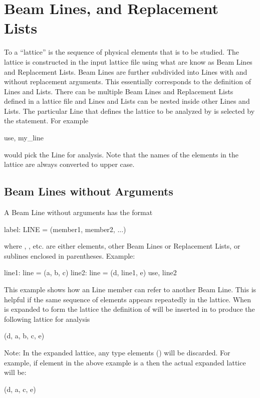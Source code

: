 \chapter{Beam Lines, and Replacement Lists}
\label{c:sequence}

To \bmad a ``lattice'' is the sequence of physical
elements that is to be studied. The lattice is constructed in the
input lattice file using what are know as Beam Lines and Replacement
Lists. Beam Lines are further subdivided into Lines with and without
replacement arguments. This essentially corresponds to the \mad
definition of Lines and Lists. There can be multiple Beam Lines and
Replacement Lists defined in a lattice file and Lines and Lists can be
nested inside other Lines and Lists. The particular Line that defines
the lattice to be analyzed by \bmad is selected by the 
statement. For example
\begin{example}
  use, my_line
\end{example}
would pick the Line  for analysis. 
Note that the names of the elements in the
lattice are always converted to upper case.

\section{Beam Lines without Arguments}
\label{s:lines.wo.arg}

A Beam Line without arguments has the format
\begin{example}
  label: LINE = (member1, member2, ...)
\end{example}
where , , etc. are either elements, other Beam
Lines or Replacement Lists, or sublines enclosed in parentheses.
Example:
\begin{example}
  line1: line = (a, b, c)
  line2: line = (d, line1, e)
  use, line2
\end{example}
This example shows how an Line member can refer to another Beam Line.
This is helpful if the same sequence of elements appears repeatedly in
the lattice. When  is expanded to form the lattice the
definition of  will be inserted in to produce the following
lattice for analysis
\begin{example}
  (d, a, b, c, e)
\end{example}
Note: In the expanded lattice, any  type elements
() will be discarded. For example, if element 
in the above example is a  then the actual expanded
lattice will be:
\begin{example}
  (d, a, c, e)
\end{example}

